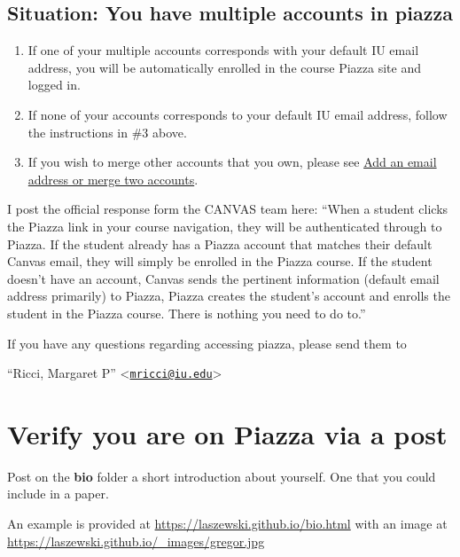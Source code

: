 \subsection*{Situation: You have multiple accounts in piazza}

\begin{enumerate}

\item
  If one of your multiple accounts corresponds with your default IU
  email address, you will be automatically enrolled in the course Piazza
  site and logged in.
\item
  If none of your accounts corresponds to your default IU email address,
  follow the instructions in \#3 above.
\item
  If you wish to merge other accounts that you own, please see
  \href{https://www.google.com/url?q=http://support.piazza.com/customer/portal/articles/1646661-add-an-email-address-or-merge-two-accounts\&sa=D\&ust=1502127148504000\&usg=AFQjCNHwO1kks2cnVLpWWCnOIEDFhl2fJA}{Add
  an email address or merge two accounts}.
\end{enumerate}

I post the official response form the CANVAS team here:
``When a student clicks the Piazza link in your course navigation, they
will be authenticated through to Piazza. If the student already has a
Piazza account that matches their default Canvas email, they will simply
be enrolled in the Piazza course. If the student doesn't have an
account, Canvas sends the pertinent information (default email address
primarily) to Piazza, Piazza creates the student's account and enrolls
the student in the Piazza course. There is nothing you need to do to.''

If you have any questions regarding accessing piazza, please send them
to

``Ricci, Margaret P''
\textless{}\href{mailto:mricci@iu.edu}{\nolinkurl{mricci@iu.edu}}\textgreater{}

\section{Verify you are on Piazza via a post}

Post on the \textbf{bio} folder a short introduction about yourself. One
that you could include in a paper.

An example is provided at \url{https://laszewski.github.io/bio.html}
with an image at \url{https://laszewski.github.io/_images/gregor.jpg}

